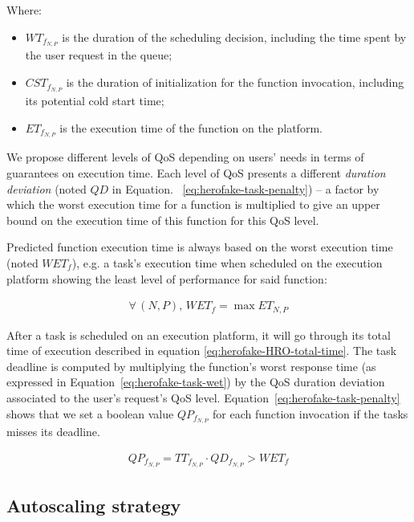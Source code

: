 Where:
\begin{itemize}
    \item ${WT}_{{f}_{N, P}}$ is the duration of the scheduling decision, including the time spent by the user request in the queue;
    \item ${CST}_{{f}_{N, P}}$ is the duration of initialization for the function invocation, including its potential cold start time; 
    \item ${ET}_{{f}_{N, P}}$ is the execution time of the function on the platform.
\end{itemize}

We propose different levels of QoS depending on users' needs in terms of guarantees on execution time. Each level of QoS presents a different \textit{duration deviation} (noted $QD$ in Equation. ~\ref{eq:herofake-task-penalty}) -- a factor by which the worst execution time for a function is multiplied to give an upper bound on the execution time of this function for this QoS level.

Predicted function execution time is always based on the worst execution time (noted $WET_{f}$), e.g. a task's execution time when scheduled on the execution platform showing the least level of performance for said function:

\begin{equation}
\begin{split}
    \forall \, (N, P), \, WET_{f} = \max ET_{N, P}
\end{split}
\label{eq:herofake-task-wet}
\end{equation}

After a task is scheduled on an execution platform, it will go through its total time of execution described in equation \ref{eq:herofake-HRO-total-time}. The task deadline is computed by multiplying the function's worst response time (as expressed in Equation~\ref{eq:herofake-task-wet}) by the QoS duration deviation associated to the user's request's QoS level. Equation~\ref{eq:herofake-task-penalty} shows that we set a boolean value $QP_{f_{N, P}}$ for each function invocation if the tasks misses its deadline. 

\begin{equation}
\begin{split}
    QP_{f_{N, P}} = TT_{f_{N, P}} \cdot QD_{f_{N, P}} > WET_{f}
\end{split}
\label{eq:herofake-task-penalty}
\end{equation}

\subsection{Autoscaling strategy} \label{section:herofake-autoscaling-strategy}


